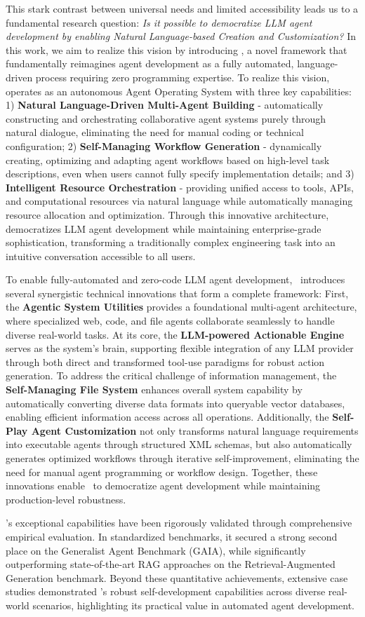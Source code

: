 This stark contrast between universal needs and limited accessibility leads us to a fundamental research question: \emph{Is it possible to democratize LLM agent development by enabling Natural Language-based Creation and Customization?} In this work, we aim to realize this vision by introducing \model, a novel framework that fundamentally reimagines agent development as a fully automated, language-driven process requiring zero programming expertise. To realize this vision, \model operates as an autonomous Agent Operating System with three key capabilities: 1) \textbf{Natural Language-Driven Multi-Agent Building} - automatically constructing and orchestrating collaborative agent systems purely through natural dialogue, eliminating the need for manual coding or technical configuration; 2) \textbf{Self-Managing Workflow Generation} - dynamically creating, optimizing and adapting agent workflows based on high-level task descriptions, even when users cannot fully specify implementation details; and 3) \textbf{Intelligent Resource Orchestration} - providing unified access to tools, APIs, and computational resources via natural language while automatically managing resource allocation and optimization. Through this innovative architecture, \model democratizes LLM agent development while maintaining enterprise-grade sophistication, transforming a traditionally complex engineering task into an intuitive conversation accessible to all users.

To enable fully-automated and zero-code LLM agent development, \model\ introduces several synergistic technical innovations that form a complete framework: First, the \textbf{Agentic System Utilities} provides a foundational multi-agent architecture, where specialized web, code, and file agents collaborate seamlessly to handle diverse real-world tasks. At its core, the \textbf{LLM-powered Actionable Engine} serves as the system's brain, supporting flexible integration of any LLM provider through both direct and transformed tool-use paradigms for robust action generation. To address the critical challenge of information management, the \textbf{Self-Managing File System} enhances overall system capability by automatically converting diverse data formats into queryable vector databases, enabling efficient information access across all operations. Additionally, the \textbf{Self-Play Agent Customization} not only transforms natural language requirements into executable agents through structured XML schemas, but also automatically generates optimized workflows through iterative self-improvement, eliminating the need for manual agent programming or workflow design. Together, these innovations enable \model\ to democratize agent development while maintaining production-level robustness.

\model's exceptional capabilities have been rigorously validated through comprehensive empirical evaluation. In standardized benchmarks, it secured a strong second place on the Generalist Agent Benchmark (GAIA), while significantly outperforming state-of-the-art RAG approaches on the Retrieval-Augmented Generation benchmark. Beyond these quantitative achievements, extensive case studies demonstrated \model's robust self-development capabilities across diverse real-world scenarios, highlighting its practical value in automated agent development.
